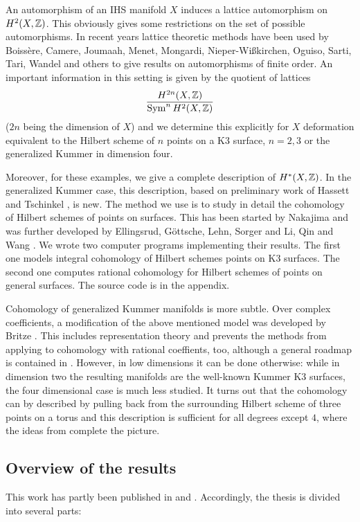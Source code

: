 An automorphism of an IHS manifold $X$ induces a lattice automorphism on $H^2(X,\mathbb{Z})$. This obviously gives some restrictions on the set of possible automorphisms.
In recent years lattice theoretic methods have been used by
Boiss\`ere, Camere, Joumaah, Menet, Mongardi, Nieper-Wi\ss kirchen, Oguiso, Sarti, Tari, Wandel and others to give results on
automorphisms of finite order. 
An important information in this setting is given by the quotient of lattices
$$
\frac{H^{2n}(X,\mathbb{Z})}{\operatorname{Sym}^n H^2(X,\mathbb{Z})}
$$
($2n$ being the dimension of $X$) and we determine this explicitly for $X$ deformation equivalent to the Hilbert scheme of $n$ points on a K3 surface, $n=2,3$ or the generalized Kummer in dimension four. 

Moreover, for these examples, we give a complete description of $H^*(X,\mathbb{Z})$. In the generalized Kummer case, this description, based on preliminary work of Hassett and Tschinkel \cite{Hassett}, is new. 
The method we use is to study in detail the cohomology of Hilbert schemes of points on surfaces. This has been started by Nakajima \cite{Nakajima} and was further developed by Ellingsrud, G\"ottsche, Lehn, Sorger \cite{EGL,LehnSorger} and Li, Qin and Wang \cite{LiQinWang,LiQinWang2,QinWang}.
We wrote two computer programs implementing their results. The first one models integral cohomology of Hilbert schemes points on K3 surfaces. The second one computes rational cohomology for Hilbert schemes of points on general surfaces. The source code is in the appendix. 

Cohomology of generalized Kummer manifolds is more subtle. Over complex coefficients, a modification of the above mentioned model was developed by Britze \cite{Britze}. This includes representation theory and prevents the methods from applying to cohomology with rational coeffients, too, although a general roadmap is contained in \cite{Twisted}.
However, in low dimensions it can be done otherwise: while in dimension two the resulting manifolds are the well-known Kummer K3 surfaces, the four dimensional case is much less studied. It turns out that the cohomology can by described by pulling back from the surrounding Hilbert scheme of three points on a torus and this description is sufficient for all degrees except $4$, where the ideas from \cite{Hassett} complete the picture.

\subsection{Overview of the results}
This work has partly been published in \cite{Kapfer2} and \cite{Kapfer}. 
Accordingly, the thesis is divided into several parts:

